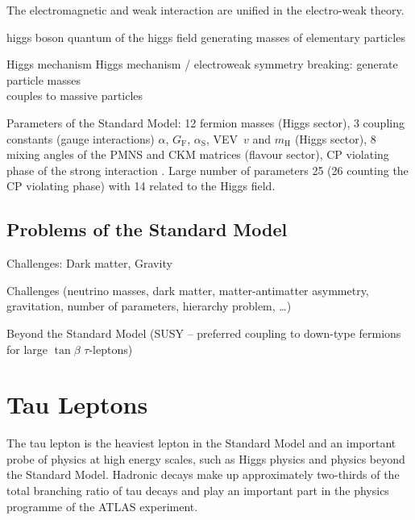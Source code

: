 The electromagnetic and weak interaction are unified in the electro-weak theory.

higgs boson quantum of the higgs field generating masses of elementary particles

Higgs mechanism
Higgs mechanism / electroweak symmetry breaking: generate particle masses\\

couples to massive particles


Parameters of the Standard Model: 12 fermion masses (Higgs sector), 3 coupling
constants (gauge interactions) $\alpha$, $G_{\text{F}}$, $\alpha_{\text{S}}$,
VEV~$v$ and $m_{\text{H}}$ (Higgs sector), 8 mixing angles of the PMNS and CKM
matrices (flavour sector), CP violating phase of the strong interaction
\cite{thomson}.
Large number of parameters 25 (26 counting the CP violating phase) with 14
related to the Higgs field.

\subsection{Problems of the Standard Model}

Challenges: Dark matter, Gravity


Challenges (neutrino masses, dark matter, matter-antimatter asymmetry,
gravitation, number of parameters, hierarchy problem, \ldots)

Beyond the Standard Model (SUSY -- preferred coupling to down-type
fermions for large $\tan\beta$ \textrightarrow $\tau$-leptons)

\section{Tau Leptons}


The tau lepton is the heaviest lepton in the Standard Model and an important
probe of physics at high energy scales, such as Higgs physics and physics beyond
the Standard Model. Hadronic decays make up approximately two-thirds of the
total branching ratio of tau decays and play an important part in the physics
programme of the ATLAS experiment.

